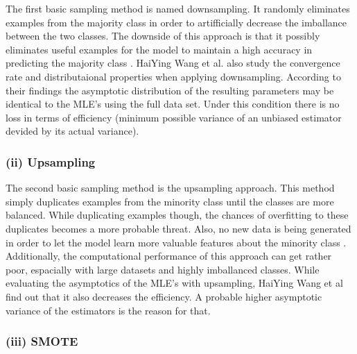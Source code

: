\documentclass[12pt,titlepage]{article}
\begin{document}
The first basic sampling method is named downsampling. It randomly eliminates examples from the majority class in order to artifficially decrease the imballance between the two classes. The downside of this approach is that it possibly eliminates useful examples for the model to maintain a high accuracy in predicting the majority class \cite{mining_rarity}. HaiYing Wang et al. also study the convergence rate and distributaional properties when applying downsampling. According to their findings the asymptotic distribution of the resulting parameters may be identical to the MLE's using the full data set. Under this condition there is no loss in terms of efficiency (minimum possible variance of an unbiased estimator devided by its actual variance). \\

\subsubsection*{(ii) Upsampling}

The second basic sampling method is the upsampling approach. This method simply duplicates examples from the minority class until the classes are more balanced. While duplicating examples though, the chances of overfitting to these duplicates becomes a more probable threat. Also, no new data is being generated in order to let the model learn more valuable features about the minority class \cite{mining_rarity}. Additionally, the computational performance of this approach can get rather poor, espacially with large datasets and highly imballanced classes. While evaluating the asymptotics of the MLE's with upsampling, HaiYing Wang et al find out that it also decreases the efficiency. A probable higher asymptotic variance of the estimators is the reason for that. \\

\subsubsection*{(iii) SMOTE}
\end{document}
